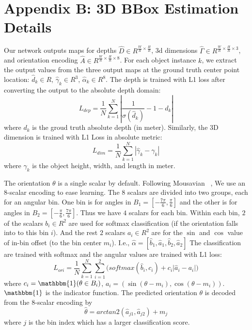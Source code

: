 \documentclass[10pt,twocolumn,letterpaper]{article}
\begin{document}
\section*{Appendix B: 3D BBox Estimation Details}

Our network outputs maps for depths $\hat{D} \in R^{\frac{W}{R} \times \frac{H}{R}}$, 3d dimensions $\hat{\Gamma} \in R^{\frac{W}{R} \times \frac{H}{R} \times 3}$, and orientation encoding $\hat{A} \in R^{\frac{W}{R} \times \frac{H}{R} \times 8}$. 
For each object instance $k$, we extract the output values from the three output maps at the ground truth center point location:
$\hat{d}_k \in R$, $\hat{\gamma}_k \in R^3$, $\hat{\alpha}_k \in R^8$.
The depth is trained with L1 loss after converting the output to the absolute depth domain:
\begin{equation}
    L_{dep} = \frac{1}{N}\sum_{k = 1}^N{|\frac{1}{\sigma(\hat{d}_k)} - 1 - d_k|}
\end{equation}
where $d_k$ is the groud truth absolute depth (in meter).
Similarly, the 3D dimension is trained with L1 Loss in absolute metric:
\begin{equation}
    L_{dim} = \frac{1}{N}\sum_{k = 1}^N{|\hat{\gamma}_k - \gamma_k|}
\end{equation}
where $\gamma_k$ is the object height, width, and length in meter.

The orientation $\theta$ is a single scalar by default.
Following Mousavian \etal~\cite{mousavian20173d,hu2018joint}, We use an $8$-scalar encoding to ease learning.
The $8$ scalars are divided into two groups, each for an angular bin.
One bin is for angles in $B_1 = [-\frac{7\pi}{6}, \frac{\pi}{6}]$ and the other is for angles in $B_2 = [-\frac{\pi}{6}, \frac{7\pi}{6}]$. 
Thus we have $4$ scalars for each bin.
Within each bin, $2$ of the scalars $b_i \in R^2$ are used for softmax classification (if the orientation falls into to this bin $i$).
And the rest $2$ scalars $a_i \in R^2$ are for the $\sin$ and $\cos$ value of in-bin offset (to the bin center $m_i$).
I.e., $\hat{\alpha} = [\hat{b}_1, \hat{a}_1, \hat{b}_2, \hat{a}_2]$
The classification are trained with softmax and the angular values are trained with L1 loss:
\begin{equation}
    L_{ori} = \frac{1}{N}\sum_{k = 1}^N{\sum_{i = 1}^2  {(softmax(\hat{b}_i, c_i) + c_i|\hat{a}_i - a_i}|)}
\end{equation}
where $c_i = \mathbbm{1}(\theta \in B_i)$, $a_i = (\sin{(\theta - m_i)}, \cos{(\theta - m_i)})$.
$\mathbbm{1}$ is the indicator function.
The predicted orientation $\theta$ is decoded from the $8$-scalar encoding by
\begin{equation}
    \hat{\theta} = arctan2(\hat{a}_{j1}, \hat{a}_{j2}) + m_j
\end{equation}
where $j$ is the bin index which has a larger classification score.
\end{document}
